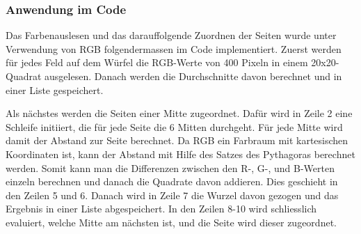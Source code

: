\documentclass[a4paper, 12pt]{article}
\begin{document}
\subsubsection{Anwendung im Code}
Das Farbenauslesen und das darauffolgende Zuordnen der Seiten wurde unter Verwendung von RGB folgendermassen im Code implementiert.
\newline
Zuerst werden für jedes Feld auf dem Würfel die RGB-Werte von 400 Pixeln in einem 20x20-Quadrat ausgelesen. Danach werden die Durchschnitte davon berechnet und in einer Liste gespeichert.

Als nächstes werden die Seiten einer Mitte zugeordnet. Dafür wird in Zeile 2 eine Schleife initiiert, die für jede Seite die 6 Mitten durchgeht. Für jede Mitte wird damit der Abstand zur Seite berechnet.
\newline
Da RGB ein Farbraum mit kartesischen Koordinaten ist, kann der Abstand mit Hilfe des Satzes des Pythagoras berechnet werden. Somit kann man die Differenzen zwischen den R-, G-, und B-Werten einzeln berechnen und danach die Quadrate davon addieren. Dies geschieht in den Zeilen 5 und 6. Danach wird in Zeile 7 die Wurzel davon gezogen und das Ergebnis in einer Liste abgespeichert.
\newline
In den Zeilen 8-10 wird schliesslich evaluiert, welche Mitte am nächsten ist, und die Seite wird dieser zugeordnet. 

\newpage
\end{document}
